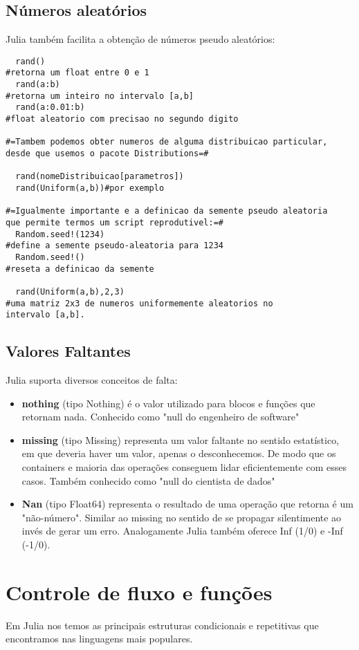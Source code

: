 \subsection{Números aleatórios}
Julia também facilita a obtenção de números pseudo aleatórios:
    \begin{lstlisting}
  rand()  
#retorna um float entre 0 e 1
  rand(a:b) 
#retorna um inteiro no intervalo [a,b]
  rand(a:0.01:b) 
#float aleatorio com precisao no segundo digito

#=Tambem podemos obter numeros de alguma distribuicao particular, 
desde que usemos o pacote Distributions=#

  rand(nomeDistribuicao[parametros])
  rand(Uniform(a,b))#por exemplo

#=Igualmente importante e a definicao da semente pseudo aleatoria
que permite termos um script reprodutivel:=#
  Random.seed!(1234) 
#define a semente pseudo-aleatoria para 1234
  Random.seed!() 
#reseta a definicao da semente

  rand(Uniform(a,b),2,3) 
#uma matriz 2x3 de numeros uniformemente aleatorios no 
intervalo [a,b].

    \end{lstlisting}
\subsection{Valores Faltantes}
Julia suporta diversos conceitos de falta:
\begin{itemize}
    \item \textbf{nothing} (tipo Nothing) é o valor utilizado para blocos e funções que retornam nada. Conhecido como "null do engenheiro de software"
    \item \textbf{missing} (tipo Missing) representa um valor faltante no sentido estatístico, em que deveria haver um valor, apenas o desconhecemos. De modo que os containers e maioria das operações conseguem lidar eficientemente com esses casos. Também conhecido como "null do cientista de dados"
    \item \textbf{Nan} (tipo Float64) representa o resultado de uma operação que retorna é um "não-número". Similar ao missing no sentido de se propagar silentimente ao invés de gerar um erro. Analogamente Julia também oferece Inf (1/0) e -Inf (-1/0).
\end{itemize}
\section{Controle de fluxo e funções}
Em Julia nos temos as principais estruturas condicionais e repetitivas que encontramos nas linguagens mais populares.

